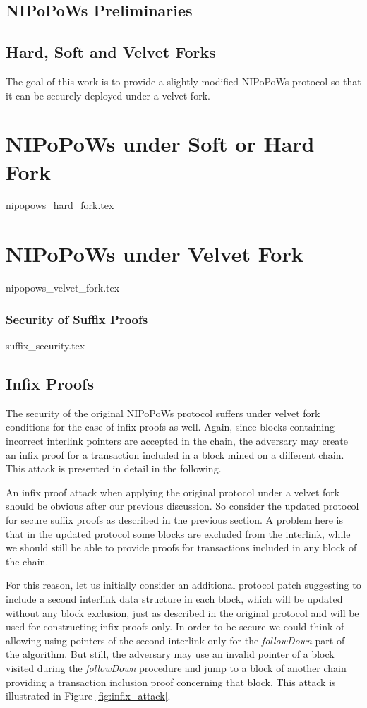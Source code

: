 \documentclass[10pt,a4paper]{article}
\begin{document}
\subsection{NIPoPoWs Preliminaries}

\subsection{Hard, Soft and Velvet Forks}
The goal of this work is to provide a slightly modified NIPoPoWs protocol so that it can be
securely deployed under a velvet fork.
\section{NIPoPoWs under Soft or Hard Fork}
{nipopows_hard_fork.tex}

\section{NIPoPoWs under Velvet Fork}
{nipopows_velvet_fork.tex}


\subsubsection{Security of Suffix Proofs}
{suffix_security.tex}


\subsection{Infix Proofs}
The security of the original NIPoPoWs protocol suffers under velvet fork conditions for the case of infix proofs as well. Again, since blocks containing incorrect interlink pointers are accepted in the chain, the adversary may create an infix proof for a transaction included in a block mined on a different chain. This attack is presented in detail in the following.

An infix proof attack when applying the original protocol under a velvet fork should be obvious after our previous discussion. So consider the updated protocol for secure suffix proofs as described in the previous section. A problem here is that in the updated protocol some blocks are excluded from the interlink, while we should still be able to provide proofs for transactions included in any block of the chain. 

For this reason, let us initially consider an additional protocol patch suggesting to include a second interlink data structure in each block, which will be updated without any block exclusion, just as described in the original protocol and will be used for constructing infix proofs only. In order to be secure we could think of allowing using pointers of the second interlink only for the \textit{followDown} part of the algorithm. But still, the adversary may use an invalid pointer of a block visited during the \textit{followDown} procedure and jump to a block of another chain providing a transaction inclusion proof concerning that block. This attack is illustrated in Figure \ref{fig:infix_attack}.
\end{document}
